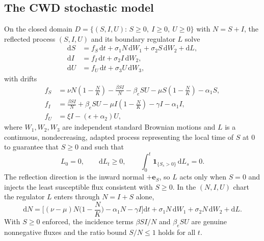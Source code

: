 \documentclass[12pt,a4paper,reqno]{amsart}
\theoremstyle{definition}
\theoremstyle{remark}
\theoremstyle{plain}
\providecommand{\dif}{\mathrm{d}}
\providecommand{\indic}{\mathbf{1}}
\begin{document}
\subsection{The CWD stochastic model}
On the closed domain $D=\{(S,I,U):\,S\ge 0,\ I\ge 0,\ U\ge 0\}$ with $N=S+I$, the reflected process $(S,I,U)$ and its boundary regulator $L$ solve
\begin{subequations}\label{eq:reflecteda}
\begin{align}
\dif S &= f_{S}\,\dif t
        + \sigma_{1} N\,\dif W_{1}
        + \sigma_{2} S\,\dif W_{2}
        + \dif L, \label{eq:reflected-Sa}\\
\dif I &= f_{I}\,\dif t
        + \sigma_{2} I\,\dif W_{2}, \label{eq:reflected-Ia}\\
\dif U &= f_{U}\,\dif t
        + \sigma_{3} U\,\dif W_{3}, \label{eq:reflected-Ua}
\end{align}
\end{subequations}
with drifts
\begin{align*}
f_{S} &= \nu N\left(1-\frac{N}{K}\right)
        - \frac{\beta S I}{N} - \beta_{e} S U
        - \mu S\left(1-\frac{N}{K}\right) - \alpha_{1} S,\\
f_{I} &= \frac{\beta S I}{N} + \beta_{e} S U
        - \mu I\left(1-\frac{N}{K}\right) - \gamma I - \alpha_{1} I,\\
f_{U} &= \xi I - (\epsilon+\alpha_{2}) U,
\end{align*}
where $W_{1},W_{2},W_{3}$ are independent standard Brownian motions and $L$ is a continuous, nondecreasing, adapted process representing the local time of $S$ at $0$ to guarantee that $S\geq 0$ and such that
\begin{equation}\label{eq:localtimea}
L_{0}=0,\qquad \dif L_{t}\ge 0,\qquad
\int_{0}^{t}\indic_{\{S_{s}>0\}}\,\dif L_{s}=0 .
\end{equation}
The reflection direction is the inward normal $+\mathbf{e}_{S}$, so $L$ acts only when $S=0$ and injects the least susceptible flux consistent with $S\geq 0$. In the $(N,I,U)$ chart the regulator $L$ enters through $N=I+S$ alone,
\begin{equation}\label{eq:reflected-N}
\dif N=\Big[(\nu-\mu)N\big(1-\frac{N}{K}\big)-\alpha_{1}N-\gamma I\Big]\dif t +\sigma_{1}N\,\dif W_{1}+\sigma_{2}N\,\dif W_{2}+\dif L .
\end{equation}
With $S\ge 0$ enforced, the incidence terms $\beta SI/N$ and $\beta_{e}SU$ are genuine nonnegative fluxes and the ratio bound $S/N\le 1$ holds for all $t$.
\end{document}
